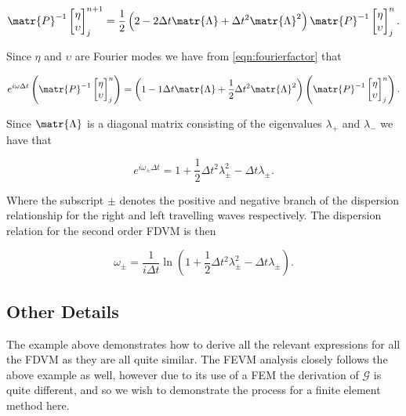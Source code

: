 \begin{equation*}
\matr{P}^{-1} \begin{bmatrix}
\eta \\ \upsilon
\end{bmatrix}^{n+1}_j = \frac{1}{2} \left(2 -2\Delta t \matr{\Lambda}  + \Delta t^2 \matr{\Lambda}^2  \right)  \matr{P}^{-1} \begin{bmatrix}
\eta \\ \upsilon
\end{bmatrix}^{n}_j.
\end{equation*}

Since $\eta$ and $\upsilon$ are Fourier modes we have from \eqref{eqn:fourierfactor} that

\begin{equation*}
e^{i\omega \Delta t} \left(\matr{P}^{-1} \begin{bmatrix}
\eta \\ \upsilon
\end{bmatrix}^{n}_j  \right)= \left(1 -1\Delta t \matr{\Lambda}  + \frac{1}{2}\Delta t^2 \matr{\Lambda}^2  \right)  \left(\matr{P}^{-1} \begin{bmatrix}
\eta \\ \upsilon
\end{bmatrix}^{n}_j  \right).
\end{equation*}

Since $\matr{\Lambda}$ is a diagonal matrix consisting of the eigenvalues $\lambda_+$ and $\lambda_-$ we have that

\begin{equation*}
e^{i\omega_\pm \Delta t} = 1 + \frac{1}{2}\Delta t^2 \lambda_{\pm}^2  -\Delta t\lambda_{\pm}. 
\end{equation*}

Where the subscript $\pm$ denotes the positive and negative branch of the dispersion relationship for the right and left travelling waves respectively. The dispersion relation for the second order FDVM is then

\begin{equation}
\label{eqn:DispersionRelationSecondOrder}
\omega_\pm = \frac{1}{i \Delta t} \ln \left(1 + \frac{1}{2}\Delta t^2 \lambda_\pm^2  -\Delta t\lambda_\pm\right).
\end{equation}
 
 \subsection{Other Details}
 The example above demonstrates how to derive all the relevant expressions for all the FDVM as they are all quite similar. The FEVM analysis closely follows the above example as well, however due to its use of a FEM the derivation of $\mathcal{G}$ is quite different, and so we wish to demonstrate the process for a finite element method here.
  
